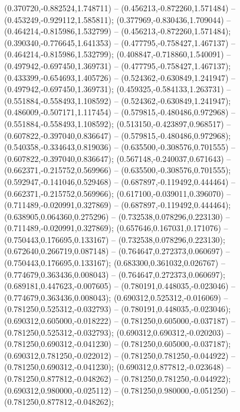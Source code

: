  (0.370720,-0.882524,1.748711) -- (0.456213,-0.872260,1.571484) -- (0.453249,-0.929112,1.585811);
 (0.377969,-0.830436,1.709044) -- (0.464214,-0.815986,1.532799) -- (0.456213,-0.872260,1.571484);
 (0.390340,-0.776645,1.641353) -- (0.477795,-0.758427,1.467137) -- (0.464214,-0.815986,1.532799);
 (0.408847,-0.718860,1.540091) -- (0.497942,-0.697450,1.369731) -- (0.477795,-0.758427,1.467137);
 (0.433399,-0.654693,1.405726) -- (0.524362,-0.630849,1.241947) -- (0.497942,-0.697450,1.369731);
 (0.459325,-0.584133,1.263731) -- (0.551884,-0.558493,1.108592) -- (0.524362,-0.630849,1.241947);
 (0.486009,-0.507171,1.117454) -- (0.579815,-0.480486,0.972968) -- (0.551884,-0.558493,1.108592);
 (0.513150,-0.423897,0.968517) -- (0.607822,-0.397040,0.836647) -- (0.579815,-0.480486,0.972968);
 (0.540358,-0.334643,0.819036) -- (0.635500,-0.308576,0.701555) -- (0.607822,-0.397040,0.836647);
 (0.567148,-0.240037,0.671643) -- (0.662371,-0.215752,0.569966) -- (0.635500,-0.308576,0.701555);
 (0.592947,-0.141046,0.529468) -- (0.687897,-0.119492,0.444464) -- (0.662371,-0.215752,0.569966);
 (0.617100,-0.039011,0.396070) -- (0.711489,-0.020991,0.327869) -- (0.687897,-0.119492,0.444464);
 (0.638905,0.064360,0.275296) -- (0.732538,0.078296,0.223130) -- (0.711489,-0.020991,0.327869);
 (0.657646,0.167031,0.171076) -- (0.750443,0.176695,0.133167) -- (0.732538,0.078296,0.223130);
 (0.672640,0.266719,0.087148) -- (0.764647,0.272373,0.060697) -- (0.750443,0.176695,0.133167);
 (0.683300,0.361032,0.026767) -- (0.774679,0.363436,0.008043) -- (0.764647,0.272373,0.060697);
 (0.689181,0.447623,-0.007605) -- (0.780191,0.448035,-0.023046) -- (0.774679,0.363436,0.008043);
 (0.690312,0.525312,-0.016069) -- (0.781250,0.525312,-0.032793) -- (0.780191,0.448035,-0.023046);
 (0.690312,0.605000,-0.018222) -- (0.781250,0.605000,-0.037187) -- (0.781250,0.525312,-0.032793);
 (0.690312,0.690312,-0.020203) -- (0.781250,0.690312,-0.041230) -- (0.781250,0.605000,-0.037187);
 (0.690312,0.781250,-0.022012) -- (0.781250,0.781250,-0.044922) -- (0.781250,0.690312,-0.041230);
 (0.690312,0.877812,-0.023648) -- (0.781250,0.877812,-0.048262) -- (0.781250,0.781250,-0.044922);
 (0.690312,0.980000,-0.025112) -- (0.781250,0.980000,-0.051250) -- (0.781250,0.877812,-0.048262);
